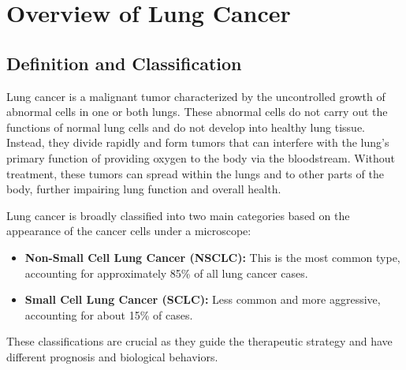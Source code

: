
\section{Overview of Lung Cancer}


\subsection{Definition and Classification}
Lung cancer is a malignant tumor characterized by the uncontrolled growth of abnormal cells in one 
or both lungs. These abnormal cells do not carry out the functions of normal lung cells and do not 
develop into healthy lung tissue. Instead, they divide rapidly and form tumors that can interfere 
with the lung’s primary function of providing oxygen to the body via the bloodstream. Without 
treatment, these tumors can spread within the lungs and to other parts of the body, further 
impairing lung function and overall health.

Lung cancer is broadly classified into two main categories based on the appearance of the cancer 
cells under a microscope:
\begin{itemize}
    \item \textbf{Non-Small Cell Lung Cancer (NSCLC):} This is the most common type, accounting for 
    approximately 85\% of all lung cancer cases.

    \item \textbf{Small Cell Lung Cancer (SCLC):} Less common and more aggressive, accounting for 
    about 15\% of cases.
\end{itemize}
These classifications are crucial as they guide the therapeutic strategy and have different 
prognosis and biological behaviors.

